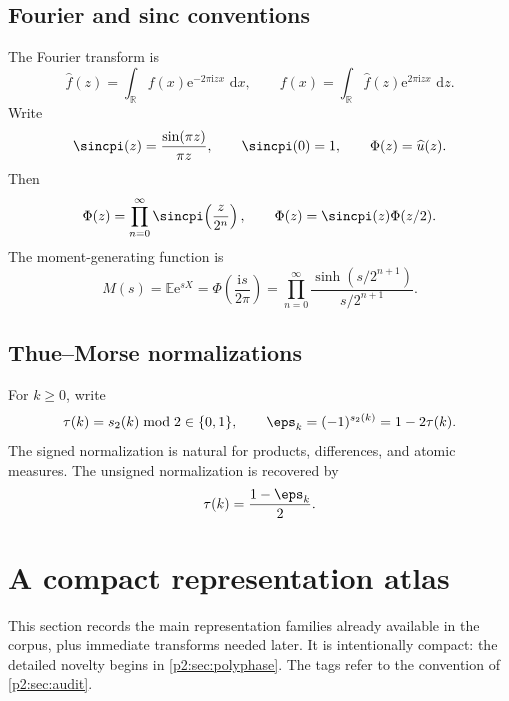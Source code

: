 \documentclass[11pt,oneside]{article}
\theoremstyle{definition}
\newcommand{\dd}{\,\mathrm d}
\newcommand{\e}{\mathrm e}
\newcommand{\ii}{\mathrm i}
\newcommand{\E}{\mathbb E}
\newcommand{\R}{\mathbb R}
\begin{document}
\subsection{Fourier and sinc conventions}

The Fourier transform is
\begin{equation}
 \widehat f(z)=\int_{\R}f(x)\e^{-2\pi\ii zx}\,\dd x,
 \qquad
 f(x)=\int_{\R}\widehat f(z)\e^{2\pi\ii zx}\,\dd z.       \label{p2:eq:Fourier-convention}
\end{equation}
Write
\begin{equation}
 \sincpi(z)=\frac{\sin(\pi z)}{\pi z},\qquad \sincpi(0)=1,
 \qquad \Phi(z)=\widehat u(z).                             \label{p2:eq:sinc-Phi}
\end{equation}
Then
\begin{equation}
 \Phi(z)=\prod_{n=0}^{\infty}\sincpi\!\left(\frac z{2^n}\right),
 \qquad
 \Phi(z)=\sincpi(z)\Phi(z/2).                              \label{p2:eq:Phi-product-scale}
\end{equation}
The moment-generating function is
\begin{equation}
 M(s)=\E\e^{sX}=\Phi\!\left(\frac{\ii s}{2\pi}\right)
 =\prod_{n=0}^{\infty}
   \frac{\sinh(s/2^{n+1})}{s/2^{n+1}}.                    \label{p2:eq:M-product}
\end{equation}

\subsection{Thue--Morse normalizations}

For $k\ge0$, write
\begin{equation}
 \tau(k)=s_2(k)\bmod2\in\{0,1\},
 \qquad
 \eps_k=(-1)^{s_2(k)}=1-2\tau(k).                          \label{p2:eq:TM-normalizations}
\end{equation}
The signed normalization is natural for products, differences, and atomic
measures.  The unsigned normalization is recovered by
\begin{equation}
 \tau(k)=\frac{1-\eps_k}{2}.                               \label{p2:eq:TM-bridge}
\end{equation}

\section{A compact representation atlas}
\label{p2:sec:atlas}

This section records the main representation families already available in the
corpus, plus immediate transforms needed later.  It is intentionally compact:
the detailed novelty begins in \cref{p2:sec:polyphase}.  The tags refer to the
convention of \cref{p2:sec:audit}.
\end{document}

